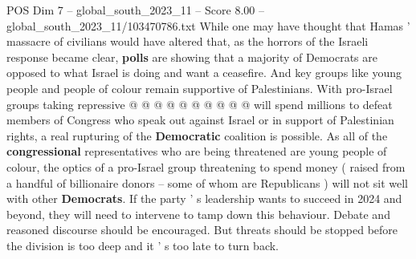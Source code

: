 \begin{textsample}{POS Dim 7 – global\_south\_2023\_11 – Score 8.00 – global\_south\_2023\_11/103470786.txt}
While one may have thought that Hamas ' massacre of civilians would have altered that, as the horrors of the Israeli response became clear, \textbf{polls} are showing that a majority of Democrats are opposed to what Israel is doing and want a ceasefire.
And key groups like young people and people of colour remain supportive of Palestinians.
With pro-Israel groups taking repressive @ @ @ @ @ @ @ @ @ @ will spend millions to defeat members of Congress who speak out against Israel or in support of Palestinian rights, a real rupturing of the \textbf{Democratic} coalition is possible.
As all of the \textbf{congressional} representatives who are being threatened are young people of colour, the optics of a pro-Israel group threatening to spend money ( raised from a handful of billionaire donors -- some of whom are Republicans ) will not sit well with other \textbf{Democrats}.
If the party ' s leadership wants to succeed in 2024 and beyond, they will need to intervene to tamp down this behaviour.
Debate and reasoned discourse should be encouraged.
But threats should be stopped before the division is too deep and it ' s too late to turn back.

\end{textsample}
